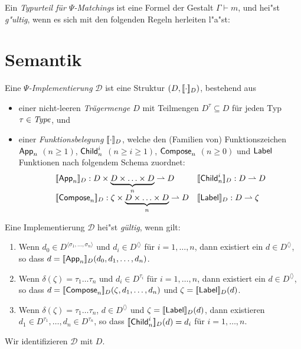 \documentclass[%
  12pt,%
  a4paper,%
]{article}
\newcommand{\Tj}[3]{{#1}\vdash{#2}\div{#3}}
\begin{document}
Ein \emph{Typurteil f\"ur $\Psi$-Matchings} ist eine Formel der Gestalt $\Gamma \vdash m$, und
hei"st \emph{g"ultig}, wenn es sich mit den folgenden Regeln herleiten l"a"st:


\section*{Semantik}

Eine \emph{$\Psi$-Implementierung} $\mathcal{D}$ ist eine Struktur $(D,[\![\cdot]\!]_D)$, bestehend aus
\begin{itemize}
\item einer nicht-leeren \emph{Tr\"agermenge $D$} mit Teilmengen $D^\tau \subseteq D$ f\"ur jeden Typ
  $\tau \in \mathit{Type}$, und
\item einer \emph{Funktionsbelegung $[\![\cdot]\!]_D$}, welche den (Familien von) Funktionszeichen
  $\mathsf{App}_n$ $(n \ge 1)$, $\mathsf{Child}_n^i$ $(n \ge i \ge 1)$, $\mathsf{Compose}_n$ $(n \ge 0)$ und $\mathsf{Label}$ Funktionen
  nach folgendem Schema zuordnet:
  \[\begin{array}{ll}
    \sem{\App_n}_D: D \times \underbrace{D \times \ldots \times D}_n \pto D &
    \sem{\Child_n^i}_D: D \pto D \\
    \sem{\Compose_n}_D: \zeta \times \underbrace{D \times \ldots \times D}_n \pto D &
    \sem{\Label}_D: D \pto \zeta \\
  \end{array}\]
\end{itemize}
Eine Implementierung $\mathcal{D}$ hei"st \emph{g\"ultig}, wenn gilt:
\begin{enumerate}
\item Wenn $d_0 \in D^{\langle \sigma_1,\ldots,\sigma_n \rangle}$ und $d_i \in D^{\langle \rangle}$ f\"ur $i=1,\ldots,n$,
  dann existiert ein $d \in D^{\langle \rangle}$, so dass $d = [\![\mathsf{App}_n]\!]_D(d_0,d_1,\ldots,d_n)$.
\item Wenn $\delta(\zeta) = \tau_1\ldots\tau_n$ und $d_i \in D^{\tau_i}$ f\"ur $i=1,\ldots,n$,
  dann existiert ein $d \in D^{\langle \rangle}$, so dass $d = [\![\mathsf{Compose}_n]\!]_D(\zeta,d_1,\ldots,d_n)$
  und $\zeta = [\![\mathsf{Label}]\!]_D(d)$.
\item Wenn $\delta(\zeta) = \tau_1\ldots\tau_n$, $d \in D^{\langle \rangle}$ und $\zeta = [\![\mathsf{Label}]\!]_D(d)$, dann
  existieren $d_1 \in D^{\tau_1},\ldots,d_n \in D^{\tau_n}$, so dass $[\![\mathsf{Child}_n^i]\!]_D(d) = d_i$ f\"ur $i=1,\ldots,n$.
\end{enumerate}
Wir identifizieren $\mathcal{D}$ mit $D$.
\end{document}
